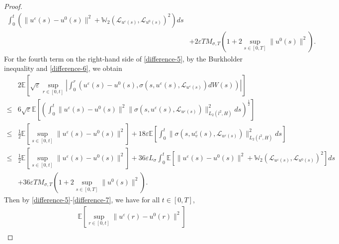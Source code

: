\documentclass[11pt]{article}
\numberwithin{equation}{section}
\theoremstyle{plain}
\def\leq{\leqslant}
\begin{document}
\begin{proof}
\begin{align}
        \int_0^t
        \left( \| u^\varepsilon (s) - u^0 (s) \|^2
        + \mathbb{W}_2 \left( \mathcal{L}_{u^\varepsilon (s)}, \mathcal{L}_{u^0(s)}
        \right)^2
        \right)
        ds  \nonumber \\
        & + 2 \varepsilon T M_{\sigma,T}
        \left( 1 + 2 \sup_{s \in [0,T]} \| u^0(s) \|^2
        \right).
    \end{align}
    For the fourth term on the right-hand side of \eqref{difference-5},
    by the Burkholder inequality and \eqref{difference-6}, we obtain
    \begin{align} \label{difference-7}
        & 2 \mathbb{E}
        \left[ \sqrt{\varepsilon}
        \sup_{r \in [0,t]}
        \left| \int_0^r
        \left( u^\varepsilon(s) - u^0 (s),
        \sigma(s, u^\varepsilon (s), \mathcal{L}_{u^\varepsilon (s)} ) dW(s)
        \right)
        \right|
        \right]
        \nonumber \\
        \leq & 6 \sqrt{\varepsilon} \mathbb{E}
        \left[
        \left(   \int_0^t
        \| u^\varepsilon(s) - u^0(s) \|^2
        \| \sigma(s, u^\varepsilon (s), \mathcal{L}_{u^\varepsilon (s)} ) \|_{L_2(l^2,H)}^2
        ds
        \right)^{\frac{1}{2}}
        \right]
        \nonumber \\
        \leq & \frac{1}{2} \mathbb{E}
        \left[ \sup_{s \in [0,t]}
        \| u^\varepsilon(s) - u^0(s) \|^2
        \right]
        + 18 \varepsilon \mathbb{E}
        \left[
        \int_{0}^{t} \| \sigma(s, u_v^\varepsilon (s), \mathcal{L}_{u^\varepsilon(s)} ) \|^2_{L_2(l^2, H)} ds
        \right]
        \nonumber \\
        \leq & \frac{1}{2} \mathbb{E}
        \left[ \sup_{s \in [0,t]}
        \| u^\varepsilon(s) - u^0(s) \|^2
        \right]
        + 36 \varepsilon L_{\sigma}
        \int_0^t \mathbb{E}
        \left[ \| u^\varepsilon (s) - u^0 (s) \|^2
        + \mathbb{W}_2 \left( \mathcal{L}_{u^\varepsilon (s)}, \mathcal{L}_{u^0(s)}
        \right)^2
        \right]
        ds  \nonumber \\
        & + 36 \varepsilon T M_{\sigma,T}
        \left( 1 + 2 \sup_{s \in [0,T]} \| u^0(s) \|^2
        \right).
    \end{align}
    Then by \eqref{difference-5}-\eqref{difference-7}, we have
    for all $t\in [0,T]$,
    \begin{align} \label{difference-8}
        & \mathbb{E}
        \left[ \sup_{r \in [0,t]}
        \| u^\varepsilon(r) - u^0 (r) \|^2
        \right]
        \nonumber \\

\end{align}
\end{proof}
\end{document}
